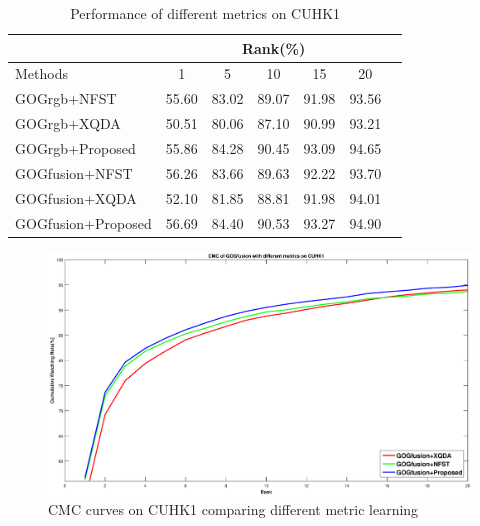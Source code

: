 \documentclass[conference,compsoc]{IEEEtran}
\begin{document}
\begin{table}[H]
\caption{Performance of different metrics on CUHK1}
\centering
\begin{tabular}{|l|c|c|c|c|c|c|}
\hline
& \multicolumn{5}{|c|}{Rank(\%)} \\
\hline
Methods& 1 & 5 &10&15& 20\\
\hline
GOGrgb+NFST&55.60 &83.02 &89.07 &91.98&93.56 \\ 
\hline
GOGrgb+XQDA&50.51 &80.06 &87.10 &90.99&93.21 \\ 
\hline
GOGrgb+Proposed&55.86&84.28&90.45&93.09&94.65\\  %
\hline
GOGfusion+NFST&56.26 &83.66 &89.63 &92.22&93.70 \\ 
\hline
GOGfusion+XQDA&52.10 &81.85&88.81 &91.98&94.01\\ 
\hline
GOGfusion+Proposed&56.69&84.40&90.53& 93.27&94.90\\

\hline

\end{tabular}\newline
\end{table}

\begin{figure}
\begin{raggedleft}
\includegraphics[width=1\linewidth]{CUHK1.eps}
\vspace{-3em}
\caption{CMC curves on CUHK1 comparing different metric learning}
\end{raggedleft}
\end{figure}
\end{document}

